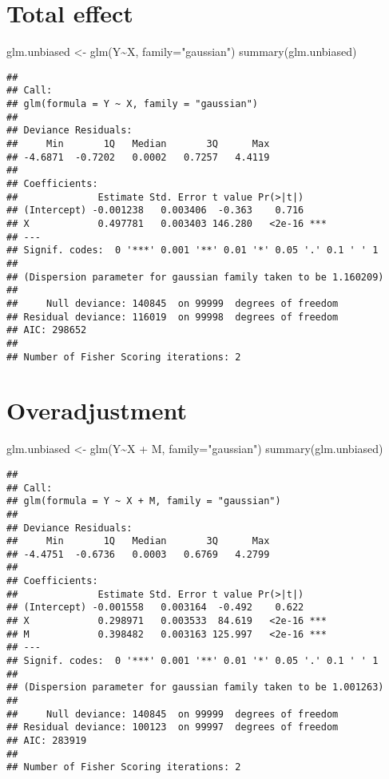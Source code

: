 \documentclass[
]{book}
\newenvironment{Shaded}{\begin{snugshade}}{\end{snugshade}}
\newcommand{\AttributeTok}[1]{\textcolor[rgb]{0.77,0.63,0.00}{#1}}
\newcommand{\FunctionTok}[1]{\textcolor[rgb]{0.00,0.00,0.00}{#1}}
\newcommand{\NormalTok}[1]{#1}
\newcommand{\OtherTok}[1]{\textcolor[rgb]{0.56,0.35,0.01}{#1}}
\newcommand{\SpecialCharTok}[1]{\textcolor[rgb]{0.00,0.00,0.00}{#1}}
\newcommand{\StringTok}[1]{\textcolor[rgb]{0.31,0.60,0.02}{#1}}
\begin{document}
\hypertarget{total-effect}{%
\section{Total effect}\label{total-effect}}

\begin{Shaded}
\begin{Highlighting}[]
\NormalTok{glm.unbiased }\OtherTok{\textless{}{-}} \FunctionTok{glm}\NormalTok{(Y}\SpecialCharTok{\textasciitilde{}}\NormalTok{X, }\AttributeTok{family=}\StringTok{"gaussian"}\NormalTok{)}
\FunctionTok{summary}\NormalTok{(glm.unbiased)}
\end{Highlighting}
\end{Shaded}

\begin{verbatim}
## 
## Call:
## glm(formula = Y ~ X, family = "gaussian")
## 
## Deviance Residuals: 
##     Min       1Q   Median       3Q      Max  
## -4.6871  -0.7202   0.0002   0.7257   4.4119  
## 
## Coefficients:
##              Estimate Std. Error t value Pr(>|t|)    
## (Intercept) -0.001238   0.003406  -0.363    0.716    
## X            0.497781   0.003403 146.280   <2e-16 ***
## ---
## Signif. codes:  0 '***' 0.001 '**' 0.01 '*' 0.05 '.' 0.1 ' ' 1
## 
## (Dispersion parameter for gaussian family taken to be 1.160209)
## 
##     Null deviance: 140845  on 99999  degrees of freedom
## Residual deviance: 116019  on 99998  degrees of freedom
## AIC: 298652
## 
## Number of Fisher Scoring iterations: 2
\end{verbatim}

\hypertarget{overadjustment}{%
\section{Overadjustment}\label{overadjustment}}

\begin{Shaded}
\begin{Highlighting}[]
\NormalTok{glm.unbiased }\OtherTok{\textless{}{-}} \FunctionTok{glm}\NormalTok{(Y}\SpecialCharTok{\textasciitilde{}}\NormalTok{X }\SpecialCharTok{+}\NormalTok{ M, }\AttributeTok{family=}\StringTok{"gaussian"}\NormalTok{)}
\FunctionTok{summary}\NormalTok{(glm.unbiased)}
\end{Highlighting}
\end{Shaded}

\begin{verbatim}
## 
## Call:
## glm(formula = Y ~ X + M, family = "gaussian")
## 
## Deviance Residuals: 
##     Min       1Q   Median       3Q      Max  
## -4.4751  -0.6736   0.0003   0.6769   4.2799  
## 
## Coefficients:
##              Estimate Std. Error t value Pr(>|t|)    
## (Intercept) -0.001558   0.003164  -0.492    0.622    
## X            0.298971   0.003533  84.619   <2e-16 ***
## M            0.398482   0.003163 125.997   <2e-16 ***
## ---
## Signif. codes:  0 '***' 0.001 '**' 0.01 '*' 0.05 '.' 0.1 ' ' 1
## 
## (Dispersion parameter for gaussian family taken to be 1.001263)
## 
##     Null deviance: 140845  on 99999  degrees of freedom
## Residual deviance: 100123  on 99997  degrees of freedom
## AIC: 283919
## 
## Number of Fisher Scoring iterations: 2
\end{verbatim}
\end{document}
